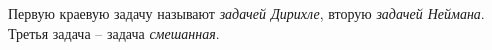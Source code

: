 Первую краевую задачу называют \textit{задачей Дирихле}, вторую \textit{задачей Неймана}. Третья задача  -- задача \textit{смешанная}. 


%
%
